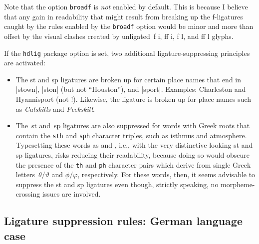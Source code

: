 \documentclass[11pt]{article}
\newcommand{\opt}[1]{\texttt{#1}}
\begin{document}
Note that the option \opt{broadf} is \emph{not} enabled by default. This is because I believe that any gain in readability that might result from breaking up the f-ligatures caught by the rules enabled by the \opt{broadf} option would be minor and more than offset by the visual clashes created by unligated~f\kern0pt i, ff\kern0pt i, f\kern0pt l, and ff\kern0pt l glyphs.

If the \opt{hdlig} package option is set, two additional ligature-suppressing principles are activated:
\begin{itemize}
\item The st and sp ligatures are broken up for certain place names that end in |stown|, |ston| (but not \enquote{Houston}), and |sport|. Examples: Charleston and Hyannisport (not !). Likewise, the \emph{} ligature is broken up for place names such as \emph{\ebg Catskills} and \emph{\ebg Peekskill}.

\item The~st and~sp ligatures are also suppressed for words with Greek roots that contain the \opt{sth} and \opt{sph} character triples, such as isthmus and atmosphere. Typesetting these words as  and , i.e., with the very distinctive looking st and sp ligatures, risks reducing their readability, because doing so would obscure the presence of the \opt{th} and \opt{ph} character pairs which derive from single Greek letters~$\theta$/$\vartheta$ and $\phi$/$\varphi$, respectively. For these words, then, it seems advisable to suppress the st and sp ligatures even though, strictly speaking, no morpheme-crossing issues are involved. 

\end{itemize}

\subsection{Ligature suppression rules: German language case} \label{sec:german-rules}
\end{document}
